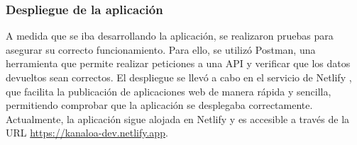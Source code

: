 \subsubsection{Despliegue de la aplicación}
\label{sec:despliegue-aplicacion}

A medida que se iba desarrollando la aplicación, se realizaron pruebas para asegurar su correcto funcionamiento. Para ello, 
se utilizó Postman, una herramienta que permite realizar peticiones a una API y verificar que los datos devueltos sean correctos. 
El despliegue se llevó a cabo en el servicio de Netlify \cite{netlify}, que facilita la publicación de aplicaciones web de manera rápida 
y sencilla, permitiendo comprobar que la aplicación se desplegaba correctamente. Actualmente, la aplicación sigue alojada en Netlify 
y es accesible a través de la URL \url{https://kanaloa-dev.netlify.app}.
